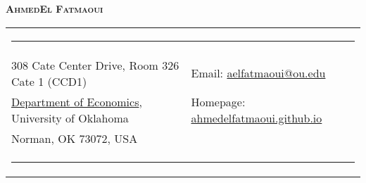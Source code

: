 \documentclass[10pt,letterpaper]{article}
\begin{document}
\begin{center}
{ \Large \textsc{\textbf{\hspace{0.005in} Ahmed}}\hspace{0.1in}\textsc{\textbf{El Fatmaoui}}}
\end{center}





\begin{tabular}{p{4.85in}p{4in}}
\multicolumn{2}{p{7.5in}}{\hrule}\\
308 Cate Center Drive, Room 326 Cate 1 (CCD1) &  Email: \href{mailto:aelfatmaoui@ou.edu}{aelfatmaoui@ou.edu} \\
\href{https://www.ou.edu/cas/economics}{Department of Economics}, University of Oklahoma & Homepage: \href{https://ahmedelfatmaoui.github.io/}{ahmedelfatmaoui.github.io} \\
Norman, OK 73072, USA  & \\
\multicolumn{2}{p{7.5in}}{\hrule}\\
\end{tabular}
\end{document}
